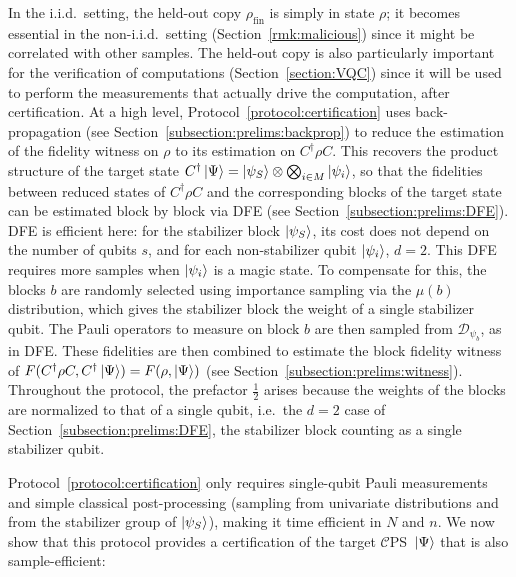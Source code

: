 \documentclass[a4paper,twocolumn,11pt,unpublished]{../../revision/quantumarticle}
\newcommand{\CEPS}{$\mathcal C$PS}
\begin{document}
        In the i.i.d.\ setting, the held-out copy $\rho_{\mathrm{fin}}$ is simply in state $\rho$; it becomes essential in the non-i.i.d.\ setting (Section~\ref{rmk:malicious}) since it might be correlated with other samples. The held-out copy is also particularly important for the verification of computations (Section~\ref{section:VQC}) since it will be used to perform the measurements that actually drive the computation, after certification. At a high level, Protocol~\ref{protocol:certification} uses back-propagation (see Section~\ref{subsection:prelims:backprop}) to reduce the estimation of the fidelity witness on $\rho$ to its estimation on $C^\dag\rho C$. This recovers the product structure of the target state $C^\dag\ket\Psi=\ket{\psi_S}\otimes\bigotimes_{i\in M}\ket{\psi_i}$, so that the fidelities between reduced states of $C^\dag\rho C$ and the corresponding blocks of the target state can be estimated block by block via DFE (see Section~\ref{subsection:prelims:DFE}). DFE is efficient here: for the stabilizer block $\ket{\psi_S}$, its cost does not depend on the number of qubits $s$, and for each non-stabilizer qubit $\ket{\psi_i}$, $d=2$. This DFE requires more samples when $\ket{\psi_i}$ is a magic state. To compensate for this, the blocks $b$ are randomly selected using importance sampling via the $\mu(b)$ distribution, which gives the stabilizer block the weight of a single stabilizer qubit. The Pauli operators to measure on block $b$ are then sampled from $\mathcal{D}_{\psi_b}$, as in DFE. These fidelities are then combined to estimate the block fidelity witness of $F(C^\dag\rho C,C^\dag\ket\Psi)=F(\rho,\ket\Psi)$ (see Section~\ref{subsection:prelims:witness}). Throughout the protocol, the prefactor $\tfrac12$ arises because the weights of the blocks are normalized to that of a single qubit, i.e.\ the $d=2$ case of Section~\ref{subsection:prelims:DFE}, the stabilizer block counting as a single stabilizer qubit.

        Protocol~\ref{protocol:certification} only requires single-qubit Pauli measurements and simple classical post-processing (sampling from univariate distributions and from the stabilizer group of $\ket{\psi_S}$), making it time efficient in $N$ and $n$. We now show that this protocol provides a certification of the target \CEPS\ $\ket\Psi$ that is also sample-efficient:
\end{document}

